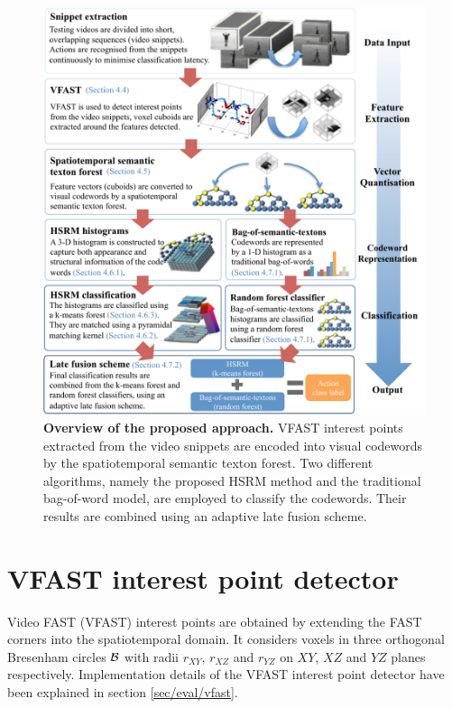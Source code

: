 \begin{figure}[!ht]
	\centering  	
	\includegraphics[width=1.0\linewidth]{fig/act/act_intro.pdf}
	\caption{\textbf{Overview of the proposed approach.} VFAST interest points extracted from the video snippets are encoded into visual codewords by the spatiotemporal semantic texton forest. Two different algorithms, namely the proposed HSRM method and the traditional bag-of-word model, are employed to classify the codewords. Their results are combined using an adaptive late fusion scheme.}
	\label{fig/act/flow}
\end{figure}

\section{VFAST interest point detector}
\label{sec/act/fastest}
Video FAST (VFAST) interest points are obtained by extending the FAST corners \cite{Rosten2006} into the spatiotemporal domain. It considers voxels in three orthogonal Bresenham circles $\mathcal{B}$ with radii $r_{XY}$, $r_{XZ}$ and $r_{YZ}$ on $XY$, $XZ$ and $YZ$ planes respectively. Implementation details of the VFAST interest point detector have been explained in section \ref{sec/eval/vfast}. 

